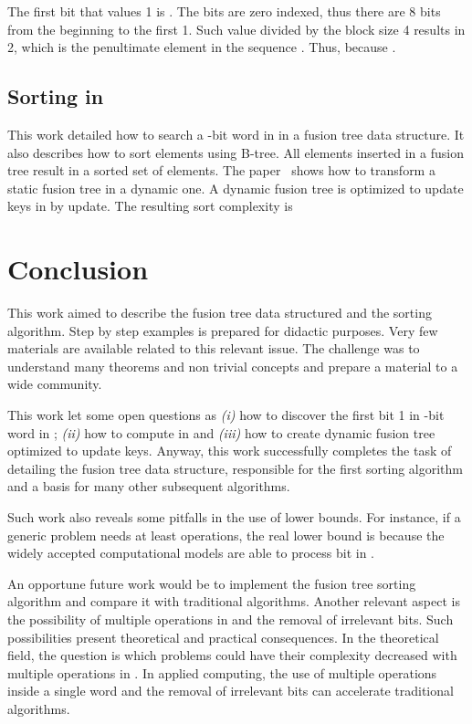 \documentclass[11pt]{article}
\begin{document}
The first bit that values 1 is . The bits are zero indexed, thus there are 8 bits from the beginning to the first 1. Such value divided by the block size 4 results in 2, which 
is the penultimate element in the sequence . Thus, because .







\subsection{
Sorting in  
}

This work detailed how to search a -bit word in    in a fusion tree data structure. It also describes how to sort  elements using B-tree.  All elements inserted in a fusion tree result in a sorted set of elements.
The paper~\cite{dynamic} shows how to transform a static fusion tree in a dynamic one. A dynamic fusion tree is optimized to update keys in  by update. The resulting sort complexity is



\section{Conclusion}
\label{cap:conclusao}

This work aimed to describe the fusion tree data structured and the  sorting algorithm. Step by step examples is prepared for didactic purposes. Very few materials are available related to this relevant issue. The challenge was to understand many theorems and non trivial concepts and prepare a material to a wide community.

	This work let some open questions as \textit{(i)} how to discover the first bit 1 in -bit word in ; \textit{(ii)} how to compute  in  and \textit{(iii)} how to create dynamic fusion tree optimized to update keys. Anyway, this work successfully completes the task of detailing the fusion tree data structure, responsible for the first  sorting algorithm and a basis for many other subsequent algorithms.
	
Such work also reveals some pitfalls in the use of lower bounds. For instance, if a generic problem needs at least  operations, the real lower bound is  because the widely accepted computational models are able to process  bit in .

An opportune future work would be to implement the fusion tree sorting algorithm and compare it with traditional algorithms. Another relevant aspect is the possibility of multiple operations in  and the removal of irrelevant bits. Such possibilities present theoretical and practical consequences. In the theoretical field, the question is which problems could have their complexity decreased with multiple operations in . In applied computing, the use of multiple operations inside a single word and the removal of irrelevant bits can accelerate traditional algorithms.








\end{document}
